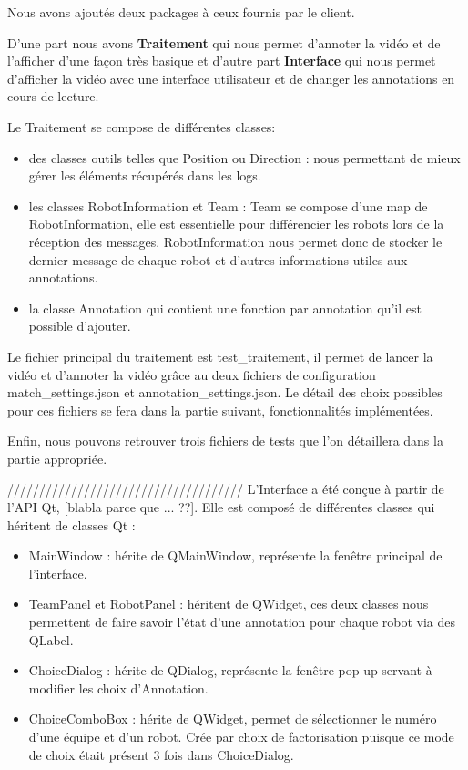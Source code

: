 Nous avons ajoutés deux packages à ceux fournis par le client.

D'une part nous avons \textbf{Traitement} qui nous permet d'annoter la vidéo et de l'afficher d'une façon très basique et d'autre part \textbf{Interface} qui nous permet d'afficher la vidéo avec une interface utilisateur et de changer les annotations en cours de lecture.
\bigskip

Le Traitement se compose de différentes classes:
\begin{itemize}
    \item des classes outils telles que Position ou Direction : nous permettant de mieux gérer les éléments récupérés dans les logs. 
    \item les classes RobotInformation et Team : Team se compose d'une map de RobotInformation, elle est essentielle pour différencier les robots lors de la réception des messages. RobotInformation nous permet donc de stocker le dernier message de chaque robot et d'autres informations utiles aux annotations.
    \item la classe Annotation qui contient une fonction par annotation qu'il est possible d'ajouter.
\end{itemize}
\bigskip

Le fichier principal du traitement est test\_traitement, il permet de lancer la vidéo et d'annoter la vidéo grâce au deux fichiers de configuration match\_settings.json et annotation\_settings.json. Le détail des choix possibles pour ces fichiers se fera dans la partie suivant, fonctionnalités implémentées.
\bigskip

Enfin, nous pouvons retrouver trois fichiers de tests que l'on détaillera dans la partie appropriée.
\bigskip

/////////////////////////////////////
\bigskip
L'Interface a été conçue à partir de l'API Qt, [blabla parce que ... ??]. Elle est composé de différentes classes qui héritent de classes Qt :
\begin{itemize}
    \item MainWindow : hérite de QMainWindow, représente la fenêtre principal de l'interface.
    \item TeamPanel et RobotPanel : héritent de QWidget, ces deux classes nous permettent de faire savoir l'état d'une annotation pour chaque robot via des QLabel.  
    \item ChoiceDialog : hérite de QDialog, représente la fenêtre pop-up servant à modifier les choix d'Annotation.
    \item ChoiceComboBox : hérite de QWidget, permet de sélectionner le numéro d'une équipe et d'un robot. Crée par choix de factorisation puisque ce mode de choix était présent 3 fois dans ChoiceDialog.
\end{itemize}
\bigskip

